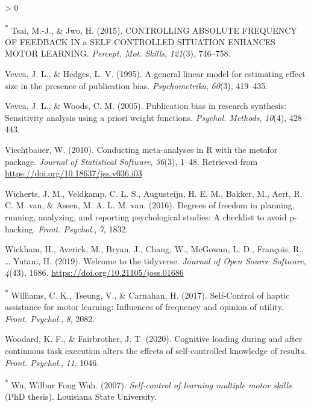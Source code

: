 \documentclass[
  english,
  man,floatsintext]{apa7}
\newlength{\cslhangindent}
\newenvironment{CSLReferences}[2] %
 {%
  \setlength{\parindent}{0pt}
  \ifodd #1 \everypar{\setlength{\hangindent}{\cslhangindent}}\ignorespaces\fi
  \ifnum #2 > 0
  \setlength{\parskip}{#2\baselineskip}
  \fi
 }%
 {}
\begin{document}
\begin{CSLReferences}{1}{0}
\leavevmode\hypertarget{ref-Tsai2015-rj}{}%
\textsuperscript{*} Tsai, M.-J., \& Jwo, H. (2015). {CONTROLLING} {ABSOLUTE} {FREQUENCY} {OF} {FEEDBACK} {IN} a {SELF-CONTROLLED} {SITUATION} {ENHANCES} {MOTOR} {LEARNING}. \emph{Percept. Mot. Skills}, \emph{121}(3), 746--758.

\leavevmode\hypertarget{ref-Vevea1995-uv}{}%
Vevea, J. L., \& Hedges, L. V. (1995). A general linear model for estimating effect size in the presence of publication bias. \emph{Psychometrika}, \emph{60}(3), 419--435.

\leavevmode\hypertarget{ref-Vevea2005-pv}{}%
Vevea, J. L., \& Woods, C. M. (2005). Publication bias in research synthesis: Sensitivity analysis using a priori weight functions. \emph{Psychol. Methods}, \emph{10}(4), 428--443.

\leavevmode\hypertarget{ref-R-metafor}{}%
Viechtbauer, W. (2010). Conducting meta-analyses in {R} with the {metafor} package. \emph{Journal of Statistical Software}, \emph{36}(3), 1--48. Retrieved from \url{https://doi.org/10.18637/jss.v036.i03}

\leavevmode\hypertarget{ref-Wicherts2016-qz}{}%
Wicherts, J. M., Veldkamp, C. L. S., Augusteijn, H. E. M., Bakker, M., Aert, R. C. M. van, \& Assen, M. A. L. M. van. (2016). Degrees of freedom in planning, running, analyzing, and reporting psychological studies: A checklist to avoid p-hacking. \emph{Front. Psychol.}, \emph{7}, 1832.

\leavevmode\hypertarget{ref-R-tidyverse}{}%
Wickham, H., Averick, M., Bryan, J., Chang, W., McGowan, L. D., François, R., \ldots{} Yutani, H. (2019). Welcome to the {tidyverse}. \emph{Journal of Open Source Software}, \emph{4}(43), 1686. \url{https://doi.org/10.21105/joss.01686}

\leavevmode\hypertarget{ref-Williams2017-pj}{}%
\textsuperscript{*} Williams, C. K., Tseung, V., \& Carnahan, H. (2017). {Self-Control} of haptic assistance for motor learning: Influences of frequency and opinion of utility. \emph{Front. Psychol.}, \emph{8}, 2082.

\leavevmode\hypertarget{ref-Woodard2020-uq}{}%
Woodard, K. F., \& Fairbrother, J. T. (2020). Cognitive loading during and after continuous task execution alters the effects of self-controlled knowledge of results. \emph{Front. Psychol.}, \emph{11}, 1046.

\leavevmode\hypertarget{ref-wu2007self}{}%
\textsuperscript{*} Wu, Wilbur Fong Wah. (2007). \emph{Self-control of learning multiple motor skills} (PhD thesis). Louisiana State University.


\end{CSLReferences}
\end{document}
